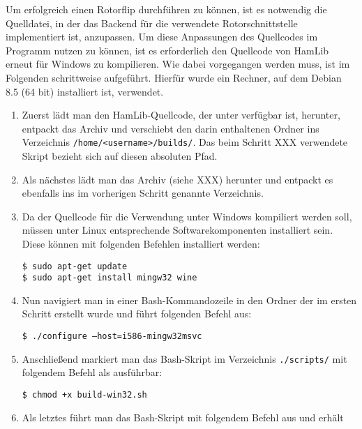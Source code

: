 Um erfolgreich einen Rotorflip durchführen zu können, ist es notwendig die Quelldatei, in der das Backend für die verwendete Rotorschnittstelle implementiert ist, anzupassen. Um diese Anpassungen des Quellcodes im Programm  nutzen zu können, ist es erforderlich den Quellcode von HamLib erneut für Windows zu kompilieren. Wie dabei vorgegangen werden muss, ist im Folgenden schrittweise aufgeführt. Hierfür wurde ein Rechner, auf dem Debian 8.5 (64 bit) installiert ist, verwendet.

\begin{enumerate}
	\parskip0pt
	\item Zuerst lädt man den HamLib-Quellcode, der unter \cite{hamlibdownload} verfügbar ist, herunter, entpackt das Archiv  und verschiebt den darin enthaltenen Ordner  ins Verzeichnis \texttt{/home/<username>/builds/}. Das beim Schritt XXX verwendete Skript bezieht sich auf diesen absoluten Pfad.
	\item Als nächstes lädt man das Archiv  (siehe XXX) herunter und entpackt es ebenfalls ins im vorherigen Schritt genannte Verzeichnis.
	\item Da der Quellcode für die Verwendung unter Windows kompiliert werden soll, müssen unter Linux entsprechende Softwarekomponenten installiert sein. Diese können mit folgenden Befehlen installiert werden:
	\vspace{-1em}
	\begin{shaded}
		\texttt{\$ sudo apt-get update}\\[-0.5em]
		\texttt{\$ sudo apt-get install mingw32 wine}
	\end{shaded}
	\vspace{-1em}	
	\item Nun navigiert man in einer Bash-Kommandozeile in den Ordner  der im ersten Schritt erstellt wurde und führt folgenden Befehl aus:
	\vspace{-1em}
	\begin{shaded}
		\texttt{\$ ./configure --host=i586-mingw32msvc}
	\end{shaded}
	\vspace{-1em}
	\newpage
	\item Anschließend markiert man das Bash-Skript  im Verzeichnis \texttt{./scripts/} mit folgendem Befehl als ausführbar:
	\vspace{-1em}
	\begin{shaded}
		\texttt{\$ chmod +x build-win32.sh}
	\end{shaded}
	\vspace{-1em}	
	\item Als letztes führt man das Bash-Skript  mit folgendem Befehl aus und erhält
\end{enumerate}

